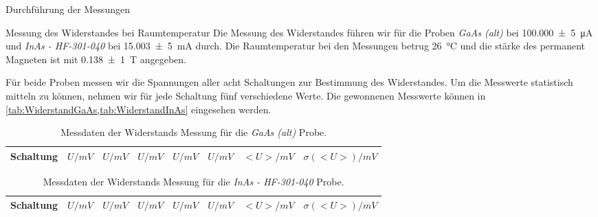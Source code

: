 \documentclass[pdftex, a4paper,11pt, twoside, ngerman]{report}
\begin{document}
  
  
  \begin{chapter}{Durchführung der Messungen}
    \label{chp:Durchführung}
    
    
    
    \begin{section}{Messung des Widerstandes bei Raumtemperatur}
      \label{chp:MessungWiderstandRaumtemperatur}
      Die Messung des Widerstandes führen wir für die Proben
      \textit{GaAs (alt)} bei \SI{100,000(5)}{\micro\ampere} und
      \textit{InAs - HF-301-040} bei \SI{15,003(5)}{\milli\ampere} durch.
      Die Raumtemperatur bei den Messungen betrug \SI{26}{\celsius} und die
      stärke des permanent Magneten ist mit \SI{0,138(1)}{\tesla} angegeben.
      
      Für beide Proben messen wir die Spannungen aller acht Schaltungen zur
      Bestimmung des Widerstandes. Um die Messwerte statistisch mitteln zu
      können, nehmen wir für jede Schaltung fünf verschiedene Werte.
      Die gewonnenen Messwerte können in
      \cref{tab:WiderstandGaAs,tab:WiderstandInAs} eingesehen werden.
      \begin{table}[htbp]
        \centering
        \footnotesize
        \begin{tabular}{|c|c|c|c|c|c|c|c|}
          \hline
          Schaltung & $U / mV$  & $U / mV$  & $U / mV$  & $U / mV$  & $U / mV$
               & $<U> / mV$  & $\sigma(<U>) / mV$ \\ \hline
          
        \end{tabular}
        \caption{Messdaten der Widerstands Messung für die \textit{GaAs (alt)}
            Probe.}
        \label{tab:WiderstandGaAs}
      \end{table}
      \begin{table}[htbp]
        \centering
        \footnotesize
        \begin{tabular}{|c|c|c|c|c|c|c|c|}
          \hline
          Schaltung & $U / mV$  & $U / mV$  & $U / mV$  & $U / mV$  & $U / mV$
               & $<U> / mV$  & $\sigma(<U>) / mV$ \\ \hline
          
        \end{tabular}
        \caption{Messdaten der Widerstands Messung für die
            \textit{InAs - HF-301-040} Probe.}
        \label{tab:WiderstandInAs}
      \end{table}
      

\end{section}
\end{chapter}
\end{document}
